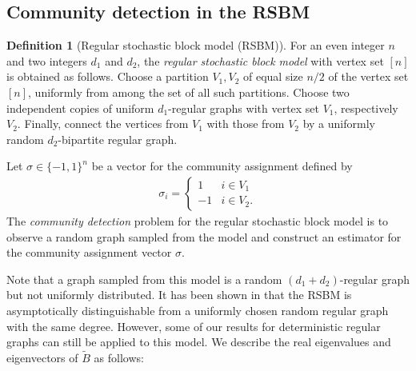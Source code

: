 \documentclass[11pt,reqno]{amsart}
\theoremstyle{definition}
\newtheorem{definition}[theorem]{Definition}
\begin{document}
\subsection{Community detection in the RSBM}
\begin{definition}[Regular stochastic block model (RSBM)]\label{def:RSBM}
  For an even integer $n$  and two integers $d_1$ and $d_2$, the \textit{regular stochastic block model} with
vertex set $[n]$ is obtained as follows. Choose a partition  $V_1,V_2$ of equal size $n/2$ of the
vertex set $[n]$, uniformly from among the set of all such partitions. Choose two independent copies of
uniform  $d_1$-regular graphs with vertex set $V_1$, respectively $V_2$. Finally, connect the vertices
from $V_1$ with those from $V_2$ by a uniformly random $d_2$-bipartite regular graph.  
\end{definition}  



Let $\sigma\in \{-1,1\}^{n}$ be a vector for the community assignment defined by 
\begin{align}
    \sigma_i=\begin{cases}
        1 & i\in V_1\\
        -1 & i\in V_2.
    \end{cases}
\end{align}
The \textit{community detection} problem for the regular stochastic block model is to observe a random graph sampled from the model and construct an estimator for the community assignment vector $\sigma$. 



Note that a graph sampled from this model is a random  $(d_1+d_2)$-regular graph but not uniformly distributed. {It has been shown in} \cite[Proposition 1]{brito2015recovery} that the RSBM is asymptotically distinguishable from a uniformly chosen random regular graph with the same degree.  However, some of our results for deterministic regular graphs can still be applied to this model.  We describe the real eigenvalues and eigenvectors of $\tilde B$ as follows:
\end{document}
